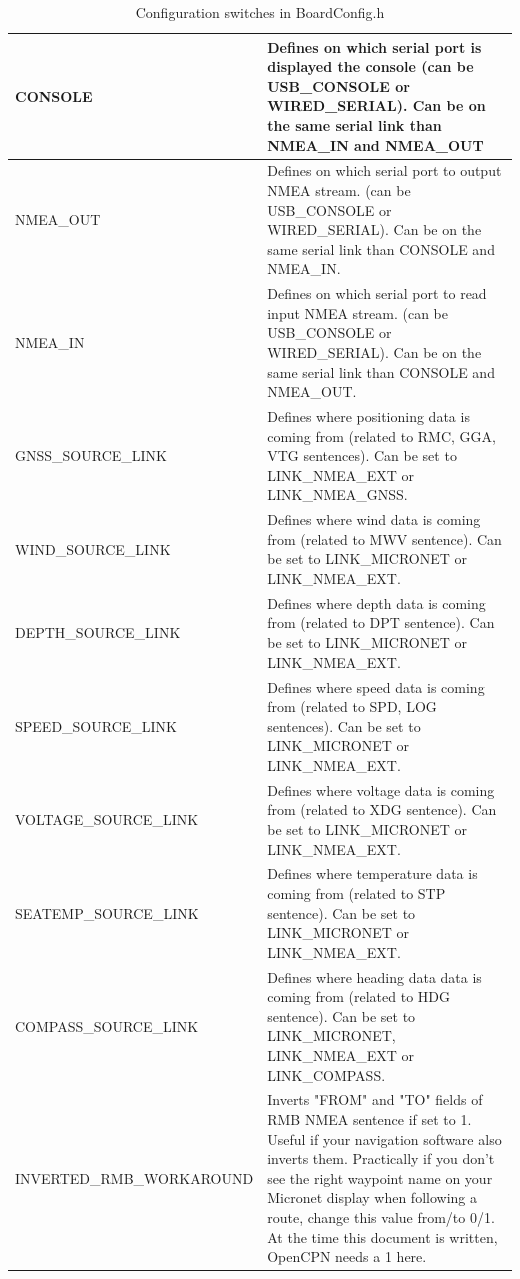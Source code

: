 \documentclass{report}
\begin{document}
\begin{table}[h]
\begin{tabular}{|l|p{12cm}|}
		\hline
		CONSOLE & Defines on which serial port is displayed the console (can be USB\_CONSOLE or WIRED\_SERIAL). Can be on the same serial link than NMEA\_IN and NMEA\_OUT\\
		\hline
		NMEA\_OUT & Defines on which serial port to output NMEA stream. (can be USB\_CONSOLE or WIRED\_SERIAL). Can be on the same serial link than CONSOLE and NMEA\_IN.\\
		\hline
		NMEA\_IN & Defines on which serial port to read input NMEA stream. (can be USB\_CONSOLE or WIRED\_SERIAL). Can be on the same serial link than CONSOLE and NMEA\_OUT.\\
		\hline
		GNSS\_SOURCE\_LINK & Defines where positioning data is coming from (related to RMC, GGA, VTG sentences). Can be set to LINK\_NMEA\_EXT or LINK\_NMEA\_GNSS.\\
		\hline
		WIND\_SOURCE\_LINK & Defines where wind data is coming from (related to MWV sentence). Can be set to LINK\_MICRONET or LINK\_NMEA\_EXT.\\
		\hline
		DEPTH\_SOURCE\_LINK & Defines where depth data is coming from (related to DPT sentence). Can be set to LINK\_MICRONET or LINK\_NMEA\_EXT.\\
		\hline
		SPEED\_SOURCE\_LINK & Defines where speed data is coming from (related to SPD, LOG sentences). Can be set to LINK\_MICRONET or LINK\_NMEA\_EXT.\\
		\hline
		VOLTAGE\_SOURCE\_LINK & Defines where voltage data is coming from (related to XDG sentence). Can be set to LINK\_MICRONET or LINK\_NMEA\_EXT.\\
		\hline
		SEATEMP\_SOURCE\_LINK & Defines where temperature data is coming from (related to STP sentence). Can be set to LINK\_MICRONET or LINK\_NMEA\_EXT.\\
		\hline
		COMPASS\_SOURCE\_LINK & Defines where heading data data is coming from (related to HDG sentence). Can be set to LINK\_MICRONET, LINK\_NMEA\_EXT or LINK\_COMPASS.\\
		\hline
		INVERTED\_RMB\_WORKAROUND & Inverts "FROM" and "TO" fields of RMB NMEA sentence if set to 1. Useful if your navigation software also inverts them. Practically if you don't see the right waypoint name on your Micronet display when following a route, change this value from/to 0/1. At the time this document is written, OpenCPN needs a 1 here.\\
		\hline
\end{tabular}
	\caption{Configuration switches in BoardConfig.h}
\label{table:configswitches}
\end{table}
\end{document}
